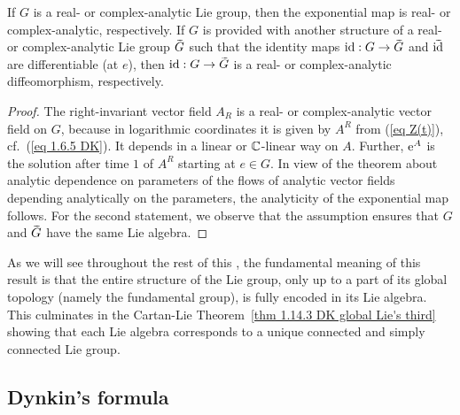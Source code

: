 \begin{prop}[{{\cite[Prop.~1.6.4]{DK}}}]
    If $G$ is a real- or complex-analytic Lie group, then the exponential map is real- or complex-analytic, respectively. If $G$ is provided with another structure of a real- or complex-analytic Lie group $\wt G$ such that the identity maps $\id:G\to \wt{G}$ and $\wt{\id}$ are differentiable (at $e$), then $\id:G\to \wt{G}$ is a real- or complex-analytic diffeomorphism, respectively.
\end{prop}
\begin{proof}
    The right-invariant vector field $A_R$ is a real- or complex-analytic vector field on $G$, because in logarithmic coordinates it is given by $A^R$ from (\ref{eq Z(t)}), cf.\ (\ref{eq 1.6.5 DK}). It depends in a linear or $\mathbb{C}$-linear way on $A$. Further, $\mathrm{e}^A$ is the solution after time $1$ of $A^R$ starting at $e\in G$. In view of the theorem about analytic dependence on parameters of the flows of analytic vector fields depending analytically on the parameters, the analyticity of the exponential map follows. For the second statement, we observe that the assumption ensures that $G$ and $\wt G$ have the same Lie algebra.
\end{proof}


\begin{rem}
    As we will see throughout the rest of this \sect, the fundamental meaning of this result is that the entire structure of the Lie group, only up to a part of its global topology (namely the fundamental group), is fully encoded in its Lie algebra. This culminates in the Cartan-Lie Theorem~\ref{thm 1.14.3 DK global Lie's third} showing that each Lie algebra corresponds to a unique connected and simply connected Lie group.
\end{rem}







\subsection{Dynkin's formula}

